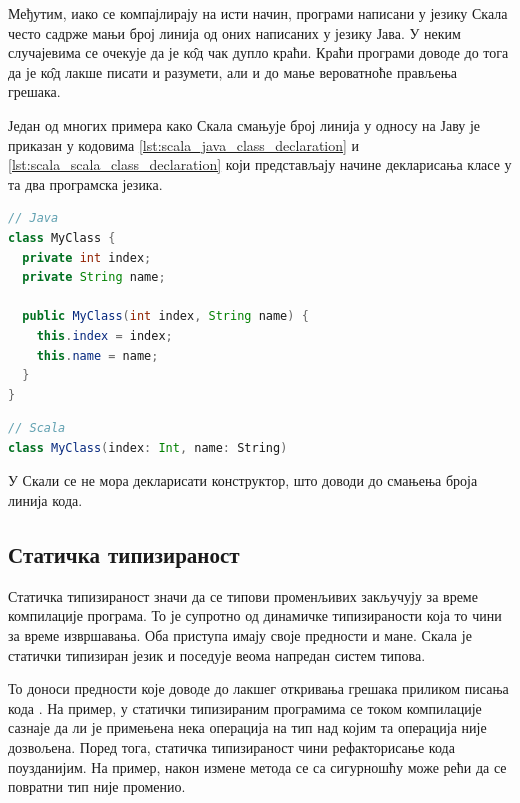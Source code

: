 \documentclass[12pt,oneside]{memoir}
\begin{document}
Међутим, иако се компајлирају на исти начин, програми написани у језику Скала често садрже мањи број линија од оних написаних у језику Јава. У неким случајевима се очекује да је к\^{о}д чак дупло краћи. Краћи програми доводе до тога да је к\^{о}д лакше писати и разумети, али и до мање вероватноће прављења грешака.

Један од многих примера како Скала смањује број линија у односу на Јаву је приказан у кодовима \ref{lst:scala_java_class_declaration} и \ref{lst:scala_scala_class_declaration} који представљају начине декларисања класе у та два програмска језика.

\begin{lstlisting}[caption={Декларација класе у језику Јава}, language=Java, label={lst:scala_java_class_declaration}]
// Java
class MyClass {  
  private int index;
  private String name;
  
  public MyClass(int index, String name) {
    this.index = index;
    this.name = name;
  }
}
\end{lstlisting}

\begin{lstlisting}[caption={Декларација класе у језику Скала}, language=Scala, label={lst:scala_scala_class_declaration}]
// Scala
class MyClass(index: Int, name: String)

\end{lstlisting}

У Скали се не мора декларисати конструктор, што доводи до смањења броја линија кода.

\subsection{Статичка типизираност}
\label{subsec:scala_stat_tip}

Статичка типизираност значи да се типови променљивих закључују за време компилације програма. То је супротно од динамичке типизираности која то чини за време извршавања. Оба приступа имају своје предности и мане. Скала је статички типизиран језик и поседује веома напредан систем типова.

То доноси предности које доводе до лакшег откривања грешака приликом писања кода \cite{scala_prog}. На пример, у статички типизираним програмима се током компилације сазнаје да ли је примењена нека операција на тип над којим та операција није дозвољена. Поред тога, статичка типизираност чини рефакторисање кода поузданијим. На пример, након измене метода се са сигурношћу може рећи да се повратни тип није променио.
\end{document}
